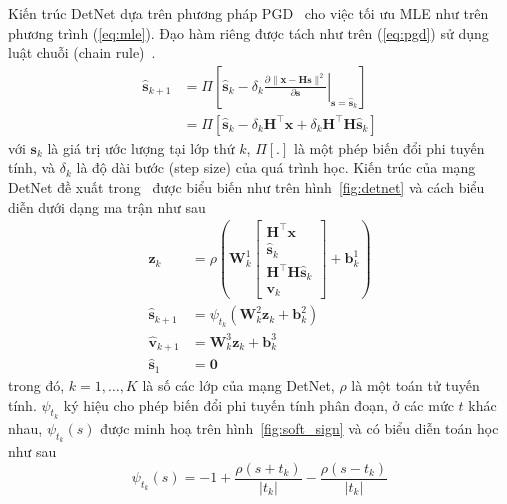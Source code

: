 Kiến trúc DetNet dựa trên phương pháp PGD~\cite{Chen2015} cho việc tối ưu MLE như trên phương trình (\ref{eq:mle}). Đạo hàm riêng được tách như trên (\ref{eq:pgd}) sử dụng luật chuỗi (chain rule)~\cite{Minka2000}.
\begin{equation}
\label{eq:pgd}
    \begin{aligned}
    \hat{\mathbf{s}}_{k+1} & =\Pi\left[\hat{\mathbf{s}}_k-\left.\delta_k \frac{\partial\|\mathbf{x}-\mathbf{H} \mathbf{s}\|^2}{\partial \mathbf{s}}\right|_{\mathbf{s}=\hat{\mathbf{s}}_k}\right] \\
    & =\Pi\left[\hat{\mathbf{s}}_k-\delta_k \mathbf{H}^\top \mathbf{x}+\delta_k \mathbf{H}^\top \mathbf{H} \hat{\mathbf{s}}_k\right]
    \end{aligned}
\end{equation}
với $\mathbf{s}_k$ là giá trị ước lượng tại lớp thứ $k$, $\Pi [.]$ là một phép biến đổi phi tuyến tính, và $\delta_k$ là độ dài bước (step size) của quá trình học. Kiến trúc của mạng DetNet đề xuất trong~\cite{Samuel2017} được biểu biến như trên hình~\ref{fig:detnet} và cách biểu diễn dưới dạng ma trận như sau
\allowdisplaybreaks
\begin{subequations}
\begin{alignat}{4}
    \mathbf{z}_k & =\rho\left(\mathbf{W}^1_{k}\left[\begin{array}{c}
    \mathbf{H}^\top \mathbf{x} \\
    \hat{\mathbf{s}}_k \\
    \mathbf{H}^\top \mathbf{H} \hat{\mathbf{s}}_k \\
    \mathbf{v}_k
    \end{array}\right]+\mathbf{b}^1_{k}\right) \\
    \hat{\mathbf{s}}_{k+1} & =\psi_{t_k}\left(\mathbf{W}^2_{k} \mathbf{z}_k+ \mathbf{b}^2_{k}\right) \\
    \hat{\mathbf{v}}_{k+1} & =\mathbf{W}^3_{k} \mathbf{z}_k+ 
    \mathbf{b}^3_{k} \\
    \hat{\mathbf{s}}_1 & =\mathbf{0}
\end{alignat}
\end{subequations}
trong đó, $k = 1, \ldots, K$ là số các lớp của mạng DetNet, $\rho$ là một toán tử tuyến tính. $\psi_{t_k}$ ký hiệu cho phép biến đổi phi tuyến tính phân đoạn, ở các mức $t$ khác nhau, $\psi_{t_k}(s)$ được minh hoạ trên hình~\ref{fig:soft_sign} và có biểu diễn toán học như sau
\begin{equation}
    \psi_{t_k}(s)=-1+\frac{\rho\left(s + t_k \right)}{\left|t_k\right|}-\frac{\rho\left(s- t_k \right)}{\left|t_k\right|}
\end{equation}

